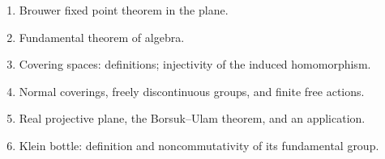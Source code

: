 \begin{enumerate}
\item Brouwer fixed point theorem in the plane.

\item Fundamental theorem of algebra.

\item Covering spaces: definitions; injectivity of the induced homomorphism.

\item Normal coverings, freely discontinuous groups, and finite free actions.

\item Real projective plane, the Borsuk--Ulam theorem, and an application.

\item Klein bottle: definition and noncommutativity of its fundamental group.
\end{enumerate}
